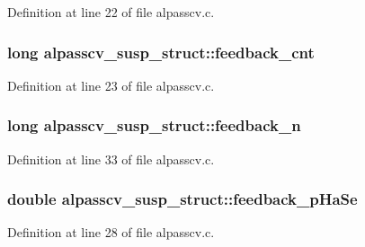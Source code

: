 Definition at line 22 of file alpasscv.\+c.

\subsubsection[{\texorpdfstring{feedback\+\_\+cnt}{feedback_cnt}}]{\setlength{\rightskip}{0pt plus 5cm}long alpasscv\+\_\+susp\+\_\+struct\+::feedback\+\_\+cnt}\hypertarget{structalpasscv__susp__struct_ad3ecb3b495a196be2362cf2d29e4c31d}{}\label{structalpasscv__susp__struct_ad3ecb3b495a196be2362cf2d29e4c31d}


Definition at line 23 of file alpasscv.\+c.

\subsubsection[{\texorpdfstring{feedback\+\_\+n}{feedback_n}}]{\setlength{\rightskip}{0pt plus 5cm}long alpasscv\+\_\+susp\+\_\+struct\+::feedback\+\_\+n}\hypertarget{structalpasscv__susp__struct_a5fa20143b5d212ab2f7492baa7126a45}{}\label{structalpasscv__susp__struct_a5fa20143b5d212ab2f7492baa7126a45}


Definition at line 33 of file alpasscv.\+c.

\subsubsection[{\texorpdfstring{feedback\+\_\+p\+Ha\+Se}{feedback_pHaSe}}]{\setlength{\rightskip}{0pt plus 5cm}double alpasscv\+\_\+susp\+\_\+struct\+::feedback\+\_\+p\+Ha\+Se}\hypertarget{structalpasscv__susp__struct_a726453b97deea795431758cfb1d03538}{}\label{structalpasscv__susp__struct_a726453b97deea795431758cfb1d03538}


Definition at line 28 of file alpasscv.\+c.

